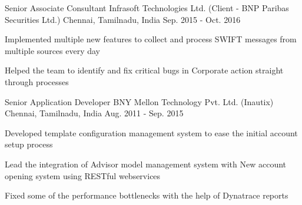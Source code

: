 \begin{cventries}
  \cventry
    {Senior Associate Consultant} %
    {Infrasoft Technologies Ltd. (Client - BNP Paribas Securities Ltd.)} %
    {Chennai, Tamilnadu, India} %
    {Sep. 2015 - Oct. 2016} %
    {
      \begin{cvitems} %
        \item {Implemented multiple new features to collect and process SWIFT messages from multiple sources every day}
        \item {Helped the team to identify and fix critical bugs in Corporate action straight through processes}        
      \end{cvitems}
    }

  \cventry
    {Senior Application Developer} %
    {BNY Mellon Technology Pvt. Ltd. (Inautix)} %
    {Chennai, Tamilnadu, India} %
    {Aug. 2011 - Sep. 2015} %
    {
      \begin{cvitems} %
        \item {Developed template configuration management system to ease the initial account setup process}
        \item {Lead the integration of Advisor model management system with New account opening system using RESTful webservices}
        \item {Fixed some of the performance bottlenecks with the help of Dynatrace reports}
      \end{cvitems}
    }

\end{cventries}
